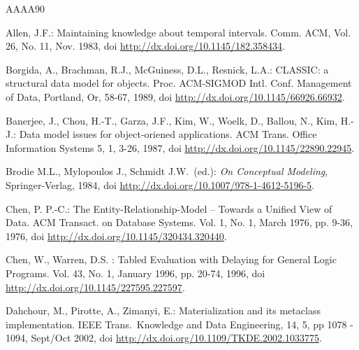 
\renewcommand{\bibname}{References}

\begin{thebibliography}{AAAA90}



 Allen, J.F.:
Maintaining knowledge about temporal intervals.
Comm. ACM, Vol. 26, No. 11, Nov. 1983,
doi \url{http://dx.doi.org/10.1145/182.358434}.

 Borgida, A., Brachman, R.J., McGuiness, D.L., Resnick, L.A.:
CLASSIC: a structural data model for objects. Proc. ACM-SIGMOD
Intl. Conf. Management of Data, Portland, Or, 58-67, 1989,
doi \url{http://dx.doi.org/10.1145/66926.66932}.

 Banerjee, J., Chou, H.-T., Garza, J.F., Kim, W., Woelk, D.,
Ballou, N., Kim, H.-J.: Data model issues for object-oriened
applications. ACM Trans. Office Information Systems 5, 1, 3-26, 1987,
doi \url{http://dx.doi.org/10.1145/22890.22945}.

Brodie M.L., Mylopoulos J., Schmidt J.W.\ (ed.):
{\em On Conceptual Modeling},
Springer-Verlag, 1984,
doi \url{http://dx.doi.org/10.1007/978-1-4612-5196-5}.

 Chen, P. P.-C.: The Entity-Relationship-Model --
Towards a Unified View of Data. ACM Transact. on Database Systems.
Vol. 1, No. 1, March 1976, pp. 9-36, 1976,
doi \url{http://dx.doi.org/10.1145/320434.320440}.

 Chen, W., Warren, D.S. : 
Tabled Evaluation with Delaying for General Logic Programs. 
Vol. 43, No. 1, January 1996, pp. 20-74, 1996,
doi \url{http://dx.doi.org/10.1145/227595.227597}.

  Dahchour, M., Pirotte, A., Zimanyi, E.:
Materialization and its metaclass implementation.
{IEEE Trans.\ Knowledge and Data Engineering},
14, 5, pp 1078 - 1094, Sept/Oct 2002, doi \url{http://dx.doi.org/10.1109/TKDE.2002.1033775}.


\end{thebibliography}
